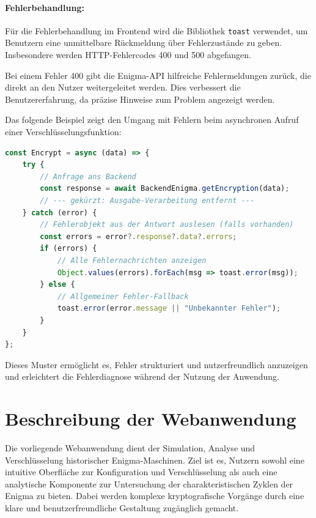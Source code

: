 \documentclass[12pt, ngerman, a4paper, numbers=noenddot]{article}
\begin{document}
\paragraph{Fehlerbehandlung:}

Für die Fehlerbehandlung im Frontend wird die Bibliothek \lstinline|toast| verwendet, um Benutzern eine unmittelbare Rückmeldung über Fehlerzustände zu geben. Insbesondere werden HTTP-Fehlercodes 400 und 500 abgefangen. 

Bei einem Fehler 400 gibt die Enigma-API hilfreiche Fehlermeldungen zurück, die direkt an den Nutzer weitergeleitet werden. Dies verbessert die Benutzererfahrung, da präzise Hinweise zum Problem angezeigt werden.

Das folgende Beispiel zeigt den Umgang mit Fehlern beim asynchronen Aufruf einer Verschlüsselungsfunktion:

\begin{lstlisting}[language=JavaScript, caption=Fehlerbehandlung mit Toast bei Backend-Anfragen in Vue 3]
const Encrypt = async (data) => {
	try {
		// Anfrage ans Backend
		const response = await BackendEnigma.getEncryption(data);
		// --- gekürzt: Ausgabe-Verarbeitung entfernt ---
	} catch (error) {
		// Fehlerobjekt aus der Antwort auslesen (falls vorhanden)
		const errors = error?.response?.data?.errors;
		if (errors) {
			// Alle Fehlernachrichten anzeigen
			Object.values(errors).forEach(msg => toast.error(msg));
		} else {
			// Allgemeiner Fehler-Fallback
			toast.error(error.message || "Unbekannter Fehler");
		}
	}
};
\end{lstlisting}

Dieses Muster ermöglicht es, Fehler strukturiert und nutzerfreundlich anzuzeigen und erleichtert die Fehlerdiagnose während der Nutzung der Anwendung.


\newpage
\section{Beschreibung der Webanwendung}


Die vorliegende Webanwendung dient der Simulation, Analyse und Verschlüsselung historischer Enigma-Maschinen. Ziel ist es, Nutzern sowohl eine intuitive Oberfläche zur Konfiguration und Verschlüsselung als auch eine analytische Komponente zur Untersuchung der charakteristischen Zyklen der Enigma zu bieten. Dabei werden komplexe kryptografische Vorgänge durch eine klare und benutzerfreundliche Gestaltung zugänglich gemacht.\autocite{enigmawebapp}
\end{document}

